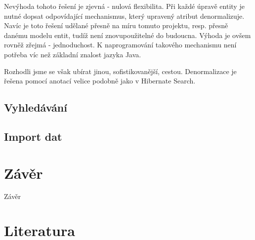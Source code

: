 \documentclass[11pt,draft,oneside]{fithesis2}
\begin{document}
Nevýhoda tohoto řešení je zjevná - nulová flexibilita. Při každé úpravě entity je nutné dopsat odpovídající mechanismus, který upravený atribut denormalizuje. Navíc je toto řešení udělané přesně na míru tomuto projektu, resp. přesně danému modelu entit,
tudíž není znovupoužitelné do budoucna. Výhoda je ovšem rovněž zřejmá - jednoduchost. K naprogramování takového mechanismu není potřeba víc než základní znalost jazyka Java.

Rozhodli jsme se však ubírat jinou, sofistikovanější, cestou. Denormalizace je řešena pomocí anotací velice podobně jako v Hibernate Search. 

\section{Vyhledávání}

\section{Import dat}

\chapter{Závěr}
Závěr



\printindex

\begingroup
\def\tmpchapter{0}
\renewcommand{\chaptername}{}
\renewcommand{\thechapter}{}
\chapter{Literatura}
\renewcommand{\chapter}[2]{}%




\endgroup

\appendix

\end{document}

